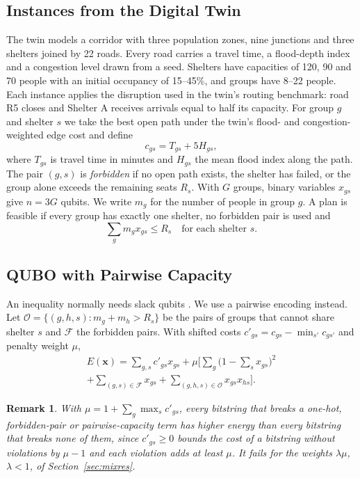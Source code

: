 \documentclass[conference]{IEEEtran}
\newtheorem{remark}{Remark}
\begin{document}
\subsection{Instances from the Digital Twin}
The twin models a corridor with three population zones, nine junctions and three shelters joined by 22 roads. Every road carries a travel time, a flood-depth index and a congestion level drawn from a seed. Shelters have capacities of 120, 90 and 70 people with an initial occupancy of 15--45\%, and groups have 8--22 people. Each instance applies the disruption used in the twin's routing benchmark: road R5 closes and Shelter A receives arrivals equal to half its capacity. For group $g$ and shelter $s$ we take the best open path under the twin's flood- and congestion-weighted edge cost and define
\begin{equation}
c_{gs}=T_{gs}+5H_{gs},
\end{equation}
where $T_{gs}$ is travel time in minutes and $H_{gs}$ the mean flood index along the path. The pair $(g,s)$ is \emph{forbidden} if no open path exists, the shelter has failed, or the group alone exceeds the remaining seats $R_s$. With $G$ groups, binary variables $x_{gs}$ give $n=3G$ qubits. We write $m_g$ for the number of people in group $g$. A plan is feasible if every group has exactly one shelter, no forbidden pair is used and
\begin{equation}
\textstyle\sum_g m_g x_{gs}\le R_s\quad\text{for each shelter } s.
\end{equation}

\subsection{QUBO with Pairwise Capacity}
An inequality normally needs slack qubits \cite{Glover2019}. We use a pairwise encoding instead. Let $\mathcal{O}=\{(g,h,s): m_g+m_h>R_s\}$ be the pairs of groups that cannot share shelter $s$ and $\mathcal{F}$ the forbidden pairs. With shifted costs $c'_{gs}=c_{gs}-\min_{s'}c_{gs'}$ and penalty weight $\mu$,
\begin{multline}
E(\mathbf{x})=\sum_{g,s}c'_{gs}x_{gs}+\mu\Big[\sum_g\Big(1-\sum_s x_{gs}\Big)^2\\
+\sum_{(g,s)\in\mathcal{F}}x_{gs}+\sum_{(g,h,s)\in\mathcal{O}}x_{gs}x_{hs}\Big].
\label{eq:qubo}
\end{multline}

\begin{remark}
With $\mu=1+\sum_g\max_s c'_{gs}$, every bitstring that breaks a one-hot, forbidden-pair or pairwise-capacity term has higher energy than every bitstring that breaks none of them, since $c'_{gs}\ge0$ bounds the cost of a bitstring without violations by $\mu-1$ and each violation adds at least $\mu$. It fails for the weights $\lambda\mu$, $\lambda<1$, of Section~\ref{sec:mixres}.
\end{remark}
\end{document}
